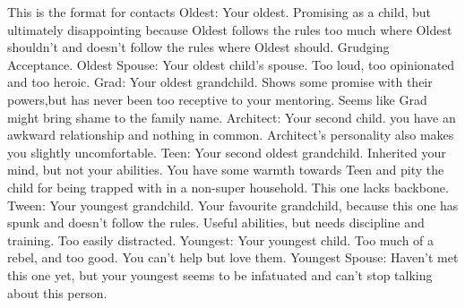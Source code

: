 \documentclass[char]{LRSguildcamp1}
\begin{document}
\begin{contacts}
	\contact{} This is the format for contacts 
	Oldest: Your oldest. Promising as a child, but ultimately disappointing because Oldest follows the rules too much where Oldest shouldn’t and doesn’t follow the rules where Oldest should. Grudging Acceptance. 
	Oldest Spouse: Your oldest child’s spouse. Too loud, too opinionated and too heroic.
	Grad: Your oldest grandchild. Shows some promise with their powers,but has never been too receptive to your mentoring. Seems like Grad might bring shame to the family name.  
	Architect: Your second child. you have an awkward relationship and nothing in common. Architect’s personality also makes you slightly uncomfortable. 
	Teen: Your second oldest grandchild. Inherited your mind, but not your abilities. You have some warmth towards Teen and pity the child for being trapped with in a non-super household. This one lacks backbone. 
	Tween: Your youngest grandchild. Your favourite grandchild, because this one has spunk and doesn’t follow the rules. Useful abilities, but needs discipline and training. Too easily distracted. 
	Youngest: Your youngest child. Too much of a rebel, and too good. You can’t help but love them. 
	Youngest Spouse: Haven’t met this one yet, but your youngest seems to be infatuated and can’t stop talking about this person. 
	
\end{contacts}
\end{document}
